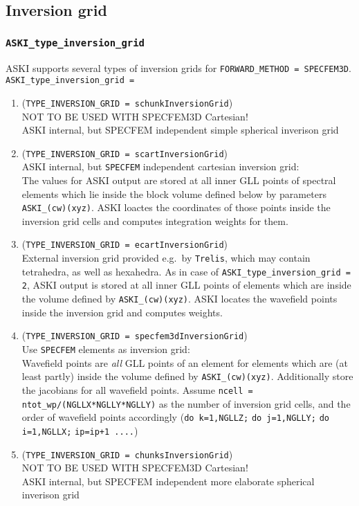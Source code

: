 \documentclass[12pt,a4paper]{article}
\newcommand{\lcode}[1]{\nolinkurl{#1}}
\newcommand{\ASKI}{ {\ttfamily ASKI} }
\begin{document}
\subsection{Inversion grid}
\subsubsection*{\lcode{ASKI_type_inversion_grid}}
\ASKI{} supports several types of inversion grids for \lcode{FORWARD_METHOD = SPECFEM3D}.
\lcode{ASKI_type_inversion_grid = }
\begin{enumerate}
\item (\lcode{TYPE_INVERSION_GRID = schunkInversionGrid}) \\ 
  NOT TO BE USED WITH SPECFEM3D Cartesian!\\
  \ASKI{} internal, but SPECFEM independent simple spherical inverison grid
\item (\lcode{TYPE_INVERSION_GRID = scartInversionGrid})\\
  \ASKI{} internal, but \lcode{SPECFEM} independent cartesian inversion grid:\\
  The values for \ASKI{} output are stored at all inner GLL points of spectral elements which lie
  inside the block volume defined below by parameters \lcode{ASKI_(cw)(xyz)}.
  \ASKI{} loactes the coordinates of those points inside the inversion grid cells and computes
  integration weights for them.
\item (\lcode{TYPE_INVERSION_GRID = ecartInversionGrid}) \\
  External inversion grid provided e.g.\ by \lcode{Trelis}, which may contain tetrahedra, as well as hexahedra.
  As in case of \lcode{ASKI_type_inversion_grid = 2}, \ASKI{} output is stored at all inner GLL points of elements
  which are inside the volume defined by \lcode{ASKI_(cw)(xyz)}.
  \ASKI{} locates the wavefield points inside the inversion grid and computes weights.
\item (\lcode{TYPE_INVERSION_GRID = specfem3dInversionGrid}) \\
  Use \lcode{SPECFEM} elements as inversion grid:\\
  Wavefield points are \emph{all} GLL points of an element for elements which are (at least partly) inside the 
  volume defined by \lcode{ASKI_(cw)(xyz)}. Additionally store the jacobians for all wavefield points.
  Assume \lcode{ncell = ntot_wp/(NGLLX*NGLLY*NGLLY)} as the number of inversion grid cells, and the order of 
  wavefield points accordingly (\lcode{do k=1,NGLLZ;} \lcode{do j=1,NGLLY;} \lcode{do i=1,NGLLX;} \lcode{ip=ip+1 ....})
\item (\lcode{TYPE_INVERSION_GRID = chunksInversionGrid}) \\ 
  NOT TO BE USED WITH SPECFEM3D Cartesian!\\
  \ASKI{} internal, but SPECFEM independent more elaborate spherical inverison grid
\end{enumerate}
\end{document}
